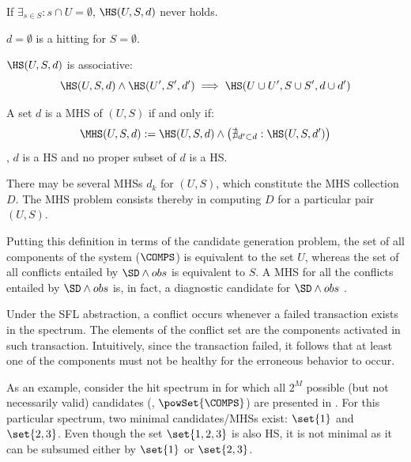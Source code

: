 \begin{corollary}
  \label{cor:intro:unsatisfiablity}
  If $\exists_{s \in S} : s \cap U = \emptyset$, $\HS(U,S,d)$ never holds.
\end{corollary}

\begin{corollary}
  \label{cor:intro:emptyHS}
  $d = \emptyset$ is a hitting for $S = \emptyset$.
\end{corollary}

\begin{corollary}
  \label{cor:intro:associativity}
  $\HS(U,S,d)$ is associative:
  \begin{equation}
    \displaystyle \HS(U,S,d) \wedge \HS(U^\prime,S^\prime,d^\prime) \implies
    \HS(U\cup U^\prime,S \cup S^\prime, d \cup d^\prime)
  \end{equation}
\end{corollary}

\begin{definition}
  A set $d$ is a \acf{MHS} of $(U,S)$ if and only if:
  \begin{equation}
    \label{eq:intro:minimal-hitting-set}
    \MHS(U,S,d):= \HS(U,S,d) \wedge \big(\nexists_{d^\prime \subset d}: \HS(U,S,d^\prime)\big)
  \end{equation}
  \noindent
  \ie, $d$ is a \ac{HS} and no proper subset of $d$ is a \ac{HS}.
\end{definition}
%
There may be several \acp{MHS} $d_k$ for $(U,S)$, which
constitute the \ac{MHS} collection $D$.
%
The \ac{MHS} problem consists thereby in computing $D$ for a
particular pair $(U,S)$.

Putting this definition in terms of the candidate generation problem,
the set of all components of the system ($\COMPS$) is equivalent to
the set $U$, whereas the set of all conflicts entailed by
$\SD \wedge obs$ is equivalent to $S$.
%
A \ac{MHS} for all the conflicts entailed by $\SD \wedge obs$ is, in
fact, a diagnostic candidate for $\SD \wedge obs$ \cite{Reiter87}.


Under the \ac{SFL} abstraction, a conflict occurs whenever a failed
transaction exists in the spectrum.
%
The elements of the conflict set are the components activated in such
transaction.
%
Intuitively, since the transaction failed, it follows that at least
one of the components must not be healthy for the erroneous behavior
to occur.


As an example, consider the hit spectrum in
 for which all $2^M$ possible (but
not necessarily valid) candidates (\ie, $\powSet{\COMPS}$) are
presented in .
%
For this particular spectrum, two minimal candidates/\acp{MHS} exist:
$\set{1}$ and $\set{2,3}$.
%
Even though the set $\set{1,2,3}$ is also \ac{HS}, it is not minimal
as it can be subsumed either by $\set{1}$ or $\set{2,3}$.


